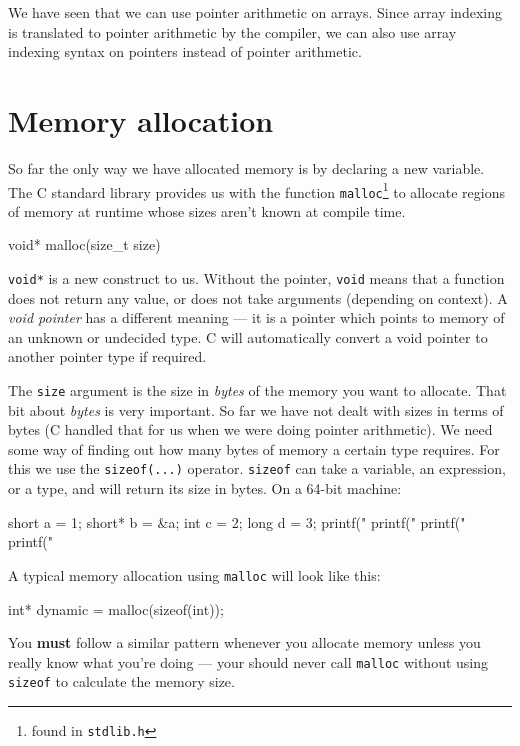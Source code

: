 We have seen that we can use pointer arithmetic on arrays.
Since array indexing is translated to pointer arithmetic by the compiler, we can also use array indexing syntax on pointers instead of pointer arithmetic.

\section{Memory allocation}

So far the only way we have allocated memory is by declaring a new variable.
The C standard library provides us with the function \lstinline!malloc!\footnote{found in \lstinline{stdlib.h}} to allocate regions of memory at runtime whose sizes aren't known at compile time.

\begin{codeinline}
void* malloc(size_t size)
\end{codeinline}

\lstinline!void*! is a new construct to us.
Without the pointer, \lstinline!void! means that a function does not return any value, or does not take arguments (depending on context).
A \emph{void pointer} has a different meaning --- it is a pointer which points to memory of an unknown or undecided type.
C will automatically convert a void pointer to another pointer type if required.

The \texttt{size} argument is the size in \emph{bytes} of the memory you want to allocate.
That bit about \emph{bytes} is very important.
So far we have not dealt with sizes in terms of bytes (C handled that for us when we were doing pointer arithmetic).
We need some way of finding out how many bytes of memory a certain type requires.
For this we use the \lstinline!sizeof(...)! operator.
\lstinline!sizeof! can take a variable, an expression, or a type, and will return its size in bytes.
On a 64-bit machine:

\begin{codeblock}
short a = 1;
short* b = &a;
int c = 2;
long d = 3;
printf("%
printf("%
printf("%
printf("%
\end{codeblock}

A typical memory allocation using \lstinline!malloc! will look like this:
\begin{codeinline}
int* dynamic = malloc(sizeof(int));
\end{codeinline}

You \textbf{must} follow a similar pattern whenever you allocate memory unless you really know what you're doing --- your should never call \lstinline!malloc! without using \lstinline!sizeof! to calculate the memory size.

